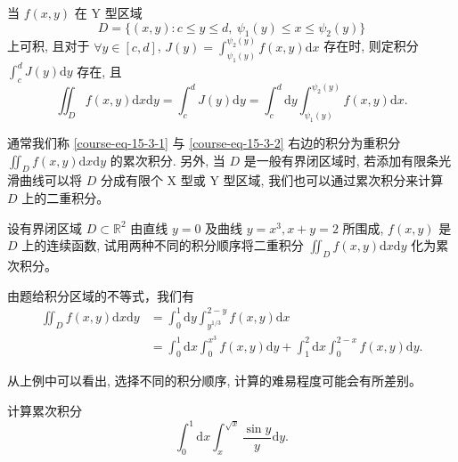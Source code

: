 \documentclass[UTF8,12pt,a4paper,fontset=fandol]{ctexart}
\begin{document}
\begin{remark}\quad 当 $f(x,y)$ 在 Y 型区域
\[
  D=\{(x,y):c\leqslant y\leqslant d,\ \psi_1(y)\leqslant x\leqslant\psi_2(y)\}
\]
上可积, 且对于 $\forall y\in[c,d]$, $J(y)=\int_{\psi_1(y)}^{\psi_2(y)}f(x,y)\mathrm dx$ 存在时, 则定积分 $\int_c^dJ(y)\mathrm dy$ 存在, 且
\begin{equation}
  \iint_D f(x,y)\mathrm dx\mathrm dy
  =\int_c^dJ(y)\mathrm dy
  =\int_c^d\mathrm dy\int_{\psi_1(y)}^{\psi_2(y)}f(x,y)\mathrm dx.
  \label{course-eq-15-3-2}
\end{equation}

通常我们称 \eqref{course-eq-15-3-1}  与 \eqref{course-eq-15-3-2}  右边的积分为重积分 $\iint_D f(x,y)\mathrm dx\mathrm dy$ 的累次积分. 另外, 当 $D$ 是一般有界闭区域时, 若添加有限条光滑曲线可以将 $D$ 分成有限个 X 型或 Y 型区域, 我们也可以通过累次积分来计算 $D$ 上的二重积分。

\end{remark}
\begin{example}\label{course-example-15-3-2}\quad 设有界闭区域 $D\subset\mathbb R^2$ 由直线 $y=0$ 及曲线 $y=x^3,x+y=2$ 所围成, $f(x,y)$ 是 $D$ 上的连续函数, 试用两种不同的积分顺序将二重积分 $\iint_D f(x,y)\mathrm dx\mathrm dy$ 化为累次积分。

\end{example}
\begin{solve}\quad 由题给积分区域的不等式，我们有
\[
\begin{aligned}
  \iint_D f(x,y)\mathrm dx\mathrm dy
  &=\int_0^1\mathrm dy\int_{y^{1/3}}^{2-y}f(x,y)\mathrm dx\\
  &=\int_0^1\mathrm dx\int_0^{x^3}f(x,y)\mathrm dy
    +\int_1^2\mathrm dx\int_0^{2-x}f(x,y)\mathrm dy.
\end{aligned}
\]

从上例中可以看出, 选择不同的积分顺序, 计算的难易程度可能会有所差别。

\end{solve}
\begin{example}\label{course-example-15-3-3}\quad 计算累次积分
\[
  \int_0^1\mathrm dx\int_x^{\sqrt x}\frac{\sin y}{y}\mathrm dy.
\]

\end{example}
\end{document}
